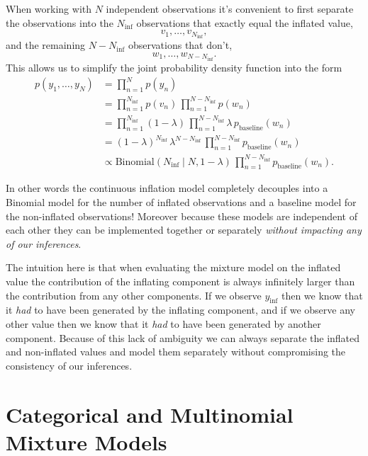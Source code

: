 \documentclass[
  letterpaper,
  DIV=11,
  numbers=noendperiod]{scrartcl}
\begin{document}
When working with \(N\) independent observations it's convenient to
first separate the observations into the \(N_{\mathrm{inf}}\)
observations that exactly equal the inflated value, \[
v_{1}, \ldots, v_{N_{\mathrm{inf}}},
\] and the remaining \(N - N_{\mathrm{inf}}\) observations that don't,
\[
w_{1}, \ldots, w_{N - N_{\mathrm{inf}}}.
\] This allows us to simplify the joint probability density function
into the form \begin{align*}
p(y_{1}, \ldots, y_{N})
&=
\prod_{n = 1}^{N} p(y_{n})
\\
&=
\prod_{n = 1}^{N_{\mathrm{inf}}} p(v_{n}) \,
\prod_{n = 1}^{N - N_{\mathrm{inf}}} p(w_{n})
\\
&=
\prod_{n = 1}^{N_{\mathrm{inf}}} (1 - \lambda) \,
\prod_{n = 1}^{N - N_{\mathrm{inf}}} \lambda \, p_{\mathrm{baseline}}(w_{n})
\\
&=
(1 - \lambda)^{N_{\mathrm{inf}}} \,
\lambda^{N - N_{\mathrm{inf}}} \,
\prod_{n = 1}^{N - N_{\mathrm{inf}}} p_{\mathrm{baseline}}(w_{n})
\\
&\propto
\mathrm{Binomial}(N_{\mathrm{inf}} \mid N, 1 - \lambda) \,
\prod_{n = 1}^{N - N_{\mathrm{inf}}} p_{\mathrm{baseline}}(w_{n}).
\end{align*}

In other words the continuous inflation model completely decouples into
a Binomial model for the number of inflated observations and a baseline
model for the non-inflated observations! Moreover because these models
are independent of each other they can be implemented together or
separately \emph{without impacting any of our inferences}.

The intuition here is that when evaluating the mixture model on the
inflated value the contribution of the inflating component is always
infinitely larger than the contribution from any other components. If we
observe \(y_{\mathrm{inf}}\) then we know that it \emph{had} to have
been generated by the inflating component, and if we observe any other
value then we know that it \emph{had} to have been generated by another
component. Because of this lack of ambiguity we can always separate the
inflated and non-inflated values and model them separately without
compromising the consistency of our inferences.

\section{Categorical and Multinomial Mixture
Models}\label{categorical-and-multinomial-mixture-models}
\end{document}
